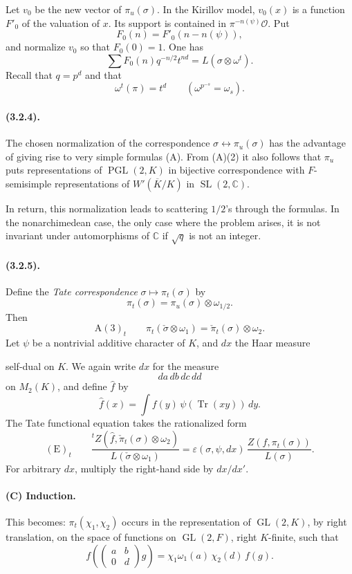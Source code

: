\documentclass[10pt,a4paper]{article}
\providecommand{\GL}{\operatorname{GL}}
\providecommand{\SL}{\operatorname{SL}}
\providecommand{\PGL}{\operatorname{PGL}}
\providecommand{\Tr}{\operatorname{Tr}}
\providecommand{\C}{\mathbb C}
\begin{document}
Let \(v_0\) be the new vector of \(\pi_u(\sigma)\). In the Kirillov model, \(v_0(x)\) is a function \(F'_0\) of the valuation of \(x\). Its support is contained in \(\pi^{-n(\psi)}\mathcal O\). Put
\[
F_0(n)=F'_0(n-n(\psi)),
\]
and normalize \(v_0\) so that \(F_0(0)=1\). One has
\[
\sum F_0(n)q^{-n/2}t^{nd}=L(\sigma\otimes\omega^t).
\]
Recall that \(q=p^d\) and that
\[
\omega^t(\pi)=t^d\qquad(\omega^{p^{-s}}=\omega_s).
\]

\paragraph{(3.2.4).} The chosen normalization of the correspondence \(\sigma\longleftrightarrow\pi_u(\sigma)\) has the advantage of giving rise to very simple formulas (A). From (A)(2) it also follows that \(\pi_u\) puts representations of \(\PGL(2,K)\) in bijective correspondence with \(F\)-semisimple representations of \(W'(\overline K/K)\) in \(\SL(2,\C)\).

In return, this normalization leads to scattering \(1/2\)'s through the formulas. In the nonarchimedean case, the only case where the problem arises, it is not invariant under automorphisms of \(\C\) if \(\sqrt q\) is not an integer.

\paragraph{(3.2.5).} Define the \emph{Tate correspondence} \(\sigma\longmapsto\pi_t(\sigma)\) by
\[
\pi_t(\sigma)=\pi_u(\sigma)\otimes\omega_{1/2}.
\]
Then
\[
\mathrm{A}(3)_t\qquad
\pi_t(\check\sigma\otimes\omega_1)=\check\pi_t(\sigma)\otimes\omega_2.
\]
Let \(\psi\) be a nontrivial additive character of \(K\), and \(dx\) the Haar measure

\clearpage
{}
\hypertarget{authority-46}{}
self-dual on \(K\). We again write \(dx\) for the measure
\[
da\,db\,dc\,dd
\]
on \(M_2(K)\), and define \(\widehat f\) by
\[
\widehat f(x)=\int f(y)\,\psi(\Tr(xy))\,dy.
\]
The Tate functional equation takes the rationalized form
\[
\mathrm{(E)}_t\qquad
\frac{{}^{t}Z(\widehat f,\check\pi_t(\sigma)\otimes\omega_2)}
     {L(\check\sigma\otimes\omega_1)}
=
\varepsilon(\sigma,\psi,dx)\,
\frac{Z(f,\pi_t(\sigma))}{L(\sigma)}.
\]
For arbitrary \(dx\), multiply the right-hand side by \(dx/dx'\).

\paragraph{(C) Induction.} This becomes: \(\pi_t(\chi_1,\chi_2)\) occurs in the representation of \(\GL(2,K)\), by right translation, on the space of functions on \(\GL(2,F)\), right \(K\)-finite, such that
\[
\tag{5.2.3.1}
f\!\left(\begin{pmatrix}a&b\\0&d\end{pmatrix}g\right)
=\chi_1\omega_1(a)\,\chi_2(d)\,f(g).
\]
\end{document}
